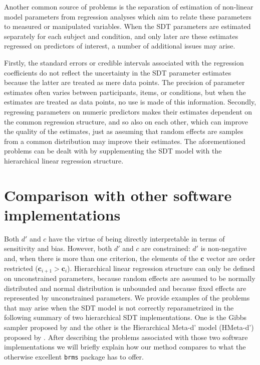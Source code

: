 \documentclass[a4paper,man,apacite,floatsintext]{apa6}
\newcommand{\code}[1]{\texttt{#1}}
\begin{document}
Another common source of problems is the separation of estimation of
non-linear model parameters from regression analyses which aim to
relate these parameters to measured or manipulated variables. When the
SDT parameters are estimated separately for each subject and
condition, and only later are these estimates regressed on predictors
of interest, a number of additional issues may arise.

Firstly, the standard errors or credible intervals associated with the
regression coefficients do not reflect the uncertainty in the SDT
parameter estimates because the latter are treated as mere data
points. The precision of parameter estimates often varies between
participants, items, or conditions, but when the estimates are treated
as data points, no use is made of this information. Secondly,
regressing parameters on numeric predictors makes their estimates
dependent on the common regression structure, and so also on each
other, which can improve the quality of the estimates, just as
assuming that random effects are samples from a common distribution
may improve their estimates. The aforementioned problems can be dealt
with by supplementing the SDT model with the hierarchical linear
regression structure.

\section{Comparison with other software implementations}

Both $d'$ and $c$ have the virtue of being directly interpretable in
terms of sensitivity and bias. However, both $d'$ and $c$ are
constrained: $d'$ is non-negative and, when there is more than one
criterion, the elements of the $\bm{c}$ vector are order restricted
($\bm{c}_{i+1} > \bm{c}_i$). Hierarchical linear regression structure
can only be defined on unconstrained parameters, because random
effects are assumed to be normally distributed and normal distribution
is unbounded and because fixed effects are represented by
unconstrained parameters. We provide examples of the problems that may
arise when the SDT model is not correctly reparametrized in the
following summary of two hierarchical SDT implementations. One is the
Gibbs sampler proposed by  and the other
is the Hierarchical Meta-d' model (HMeta-d') proposed by
. After describing the problems associated with those
two software implementations we will briefly explain how our method
compares to what the otherwise excellent \code{brms} package has to
offer.
\end{document}
